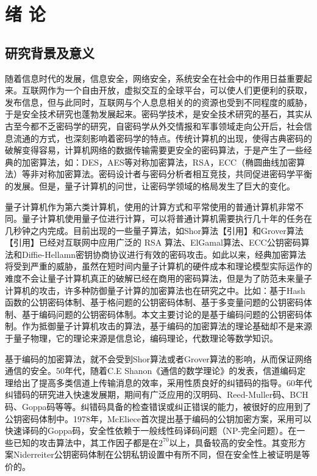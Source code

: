 \chapter{绪\hskip 0.4cm 论}
\label{chap1}

\section{研究背景及意义}
随着信息时代的发展，信息安全，网络安全，系统安全在社会中的作用日益重要起来。互联网作为一个自由开放，虚拟交互的全球平台，可以使人们更便利的获取，发布信息，但与此同时，互联网与个人息息相关的的资源也受到不同程度的威胁，于是安全技术研究也蓬勃发展起来。密码学技术，是安全技术研究的基石，其实从古至今都不乏密码学的研究，自密码学从外交情报和军事领域走向公开后，社会信息流通的方式，也深刻影响着密码学的特点。传统计算机的出现，使得古典密码的破解变得容易，计算机网络的数据传输需要更安全的密码算法，于是产生了一些经典的加密算法，如：DES，AES等对称加密算法，RSA，ECC（椭圆曲线加密算法）等非对称加密算法。密码设计者与密码分析者相互竞技，共同促进密码学平衡的发展。但是，量子计算机的问世，让密码学领域的格局发生了巨大的变化。

量子计算机作为第六类计算机，使用的计算方式和平常使用的普通计算机非常不同。量子计算机使用量子位进行计算，可以将普通计算机需要执行几十年的任务在几秒钟之内完成。目前出现的一些量子算法，如Shor算法【引用】和Grover算法【引用】已经对互联网中应用广泛的 RSA 算法、ElGamal算法、ECC公钥密码算法和Diffie-Hellamn密钥协商协议进行有效的密码攻击。如此以来，经典加密算法将受到严重的威胁，虽然在短时间内量子计算机的硬件成本和理论模型实际运作的难度不会让量子计算机真正的破解已经在商用的密码算法，但是为了防范未来量子计算机的攻击，许多种防御量子计算的加密算法也在研究之中。比如：基于Hash函数的公钥密码体制、基于格问题的公钥密码体制、基于多变量问题的公钥密码体制、基于编码问题的公钥密码体制。本文主要讨论的是基于编码问题的公钥密码体制。作为抵御量子计算机攻击的算法，基于编码的加密算法的理论基础却不是来源于量子物理，它的理论来源是信息论，编码理论，代数理论等数学知识。

基于编码的加密算法，就不会受到Shor算法或者Grover算法的影响，从而保证网络通信的安全。50年代，随着C.E Shanon《通信的数学理论》的发表，信道编码定理给出了提高多类信道上传输消息的效率，采用性质良好的纠错码的指导。60年代纠错码的研究进入快速发展期，期间有广泛应用的汉明码、Reed-Muller码、BCH码、Goppa码等等。纠错码具备的检查错误或纠正错误的能力，被很好的应用到了公钥密码体制中。1978年，McEliece首次提出基于编码的公钥加密方案，采用可以快速译码的Goppa码，安全性依赖于一般线性码译码问题（NP-完全问题）。在一些已知的攻击算法中，其工作因子都是在$2 ^ {70}$以上，具备较高的安全性。其变形方案Niderreiter公钥密码体制在公钥私钥设置中有所不同，但在安全性上被证明是等价的。


